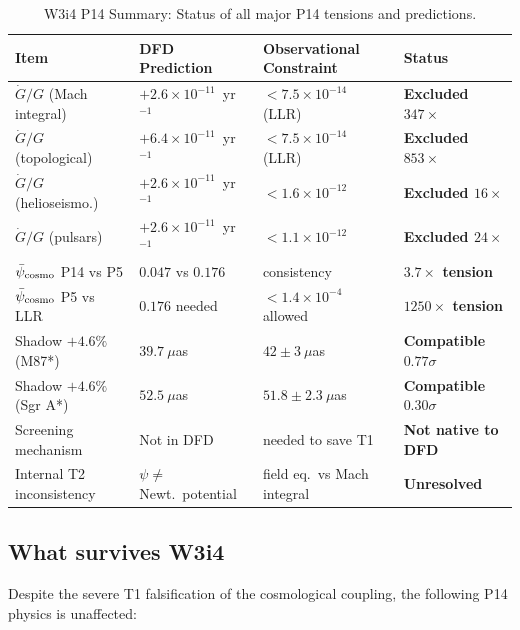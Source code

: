 \documentclass[11pt]{article}
\newcommand{\ee}[1]{\times 10^{#1}}
\newcommand{\psicosmo}{\bar{\psi}_{\rm cosmo}}
\begin{document}
\begin{table}[h!]
\centering
\caption{W3i4 P14 Summary: Status of all major P14 tensions and predictions.}
\label{tab:summary}
\begin{tabular}{p{4.5cm}p{4cm}p{4cm}p{2cm}}
\toprule
\textbf{Item} & \textbf{DFD Prediction} & \textbf{Observational Constraint} & \textbf{Status} \\
\midrule
$\dot{G}/G$ (Mach integral) & $+2.6\ee{-11}$~yr$^{-1}$ & $< 7.5\ee{-14}$ (LLR) & \textbf{Excluded $347\times$} \\
$\dot{G}/G$ (topological) & $+6.4\ee{-11}$~yr$^{-1}$ & $< 7.5\ee{-14}$ (LLR) & \textbf{Excluded $853\times$} \\
$\dot{G}/G$ (helioseismo.) & $+2.6\ee{-11}$~yr$^{-1}$ & $< 1.6\ee{-12}$ & \textbf{Excluded $16\times$} \\
$\dot{G}/G$ (pulsars) & $+2.6\ee{-11}$~yr$^{-1}$ & $< 1.1\ee{-12}$ & \textbf{Excluded $24\times$} \\
$\psicosmo$ P14 vs P5 & $0.047$ vs $0.176$ & consistency & \textbf{$3.7\times$ tension} \\
$\psicosmo$ P5 vs LLR & $0.176$ needed & $< 1.4\ee{-4}$ allowed & \textbf{$1250\times$ tension} \\
Shadow $+4.6\%$ (M87*) & $39.7~\mu$as & $42\pm3~\mu$as & \textbf{Compatible $0.77\sigma$} \\
Shadow $+4.6\%$ (Sgr A*) & $52.5~\mu$as & $51.8\pm2.3~\mu$as & \textbf{Compatible $0.30\sigma$} \\
Screening mechanism & Not in DFD & needed to save T1 & \textbf{Not native to DFD} \\
Internal T2 inconsistency & $\psi \ne$ Newt.\ potential & field eq.\ vs Mach integral & \textbf{Unresolved} \\
\bottomrule
\end{tabular}
\end{table}

\subsection{What survives W3i4}

Despite the severe T1 falsification of the cosmological coupling, the following
P14 physics is unaffected:
\end{document}
